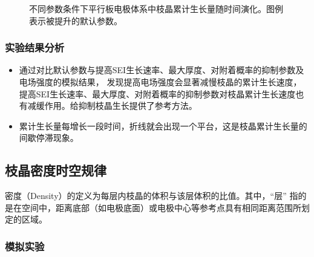 \documentclass{article}
\begin{document}
\begin{figure}[H]
\begin{minipage}{0.45\textwidth}
   \caption{不同参数条件下平行板电极体系中枝晶累计生长量随时间演化。图例表示被提升的默认参数。}
               \end{minipage}
           \end{figure}
  \subsubsection{实验结果分析}
   \begin{itemize}
       \item 通过对比默认参数与提高SEI生长速率、最大厚度、对附着概率的抑制参数及电场强度的模拟结果，
       发现提高电场强度会显著减慢枝晶的累计生长速度，提高SEI生长速率、最大厚度、对附着概率的抑制参数对枝晶累计生长速度也有减缓作用。给抑制枝晶生长提供了参考方法。
       \item 累计生长量每增长一段时间，折线就会出现一个平台，这是枝晶累计生长量的间歇停滞现象。
   \end{itemize}
   
     \subsection{枝晶密度时空规律}
   密度（Density）的定义为每层内枝晶的体积与该层体积的比值。其中，“层” 指的是在空间中，距离底部（如电极底面）或电极中心等参考点具有相同距离范围所划定的区域。
   \subsubsection{模拟实验}
\end{document}
